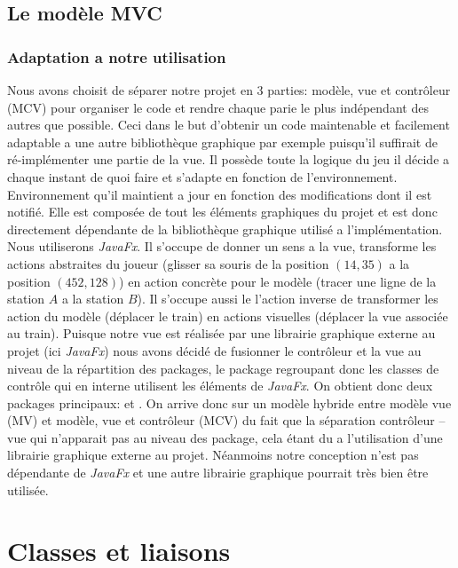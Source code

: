 \documentclass[report, backcover, french, nodocumentinfo]{upmethodology-document}
\begin{document}
		\section{Le modèle MVC}
			\subsection{Adaptation a notre utilisation}
					Nous avons choisit de séparer notre projet en 3 parties: modèle, vue et contrôleur (MCV) pour organiser le code et rendre chaque parie le plus indépendant des autres que possible. Ceci dans le but d'obtenir un code maintenable et facilement adaptable a une autre bibliothèque graphique par exemple puisqu'il suffirait de ré-implémenter une partie de la vue.
					Il possède toute la logique du jeu il décide a chaque instant de quoi faire et s'adapte en fonction de l’environnement. Environnement qu'il maintient a jour en fonction des modifications dont il est notifié.
					Elle est composée de tout les éléments graphiques du projet et est donc directement dépendante de la bibliothèque graphique utilisé a l'implémentation. Nous utiliserons \textit{JavaFx}.
					Il s'occupe de donner un sens a la vue, transforme les actions abstraites du joueur (glisser sa souris de la position $(14,35)$ a la position $(452,128)$) en action concrète pour le modèle (tracer une ligne de la station $A$ a la station $B$). Il s’occupe aussi le l'action inverse de transformer les action du modèle (déplacer le train) en actions visuelles (déplacer la vue associée au train).
					Puisque notre vue est réalisée par une librairie graphique externe au projet (ici \textit{JavaFx}) nous avons décidé de fusionner le contrôleur et la vue au niveau de la répartition des packages, le package  regroupant donc les classes de contrôle qui en interne utilisent les éléments de \textit{JavaFx}. On obtient donc deux packages principaux:  et .
				\p{}
					On arrive donc sur un modèle hybride entre modèle vue (MV) et modèle, vue et contrôleur (MCV) du fait que la séparation contrôleur -- vue qui n'apparait pas au niveau des package, cela étant du a l'utilisation d'une librairie graphique externe au projet. Néanmoins notre conception n'est pas dépendante de \textit{JavaFx} et une autre librairie graphique pourrait très bien être utilisée.

	\chapter{Classes et liaisons}
\end{document}
